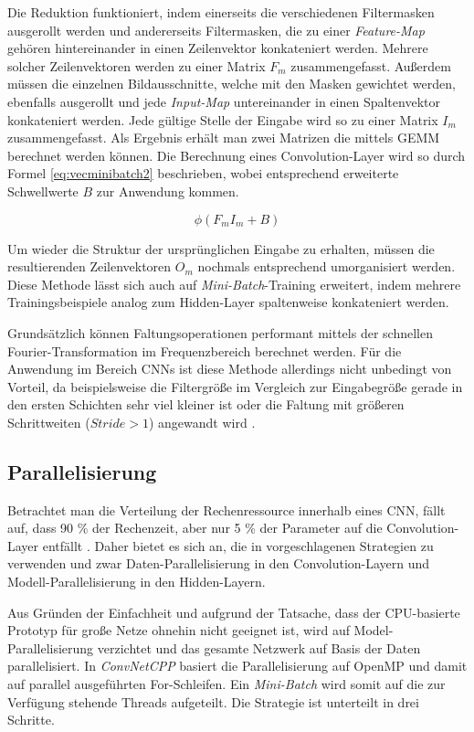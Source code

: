 Die Reduktion funktioniert, indem einerseits die verschiedenen Filtermasken ausgerollt werden und andererseits Filtermasken, die zu einer \textit{Feature-Map} gehören hintereinander in einen Zeilenvektor konkateniert werden. Mehrere solcher Zeilenvektoren werden zu einer Matrix $F_m$ zusammengefasst. Außerdem müssen die einzelnen Bildausschnitte, welche mit den Masken gewichtet werden, ebenfalls ausgerollt und jede \textit{Input-Map} untereinander in einen Spaltenvektor konkateniert werden. Jede gültige Stelle der Eingabe wird so zu einer Matrix $I_m$ zusammengefasst. Als Ergebnis erhält man zwei Matrizen die mittels GEMM berechnet werden können. Die Berechnung eines Convolution-Layer wird so durch Formel \ref{eq:vecminibatch2} beschrieben, wobei entsprechend erweiterte Schwellwerte $B$ zur Anwendung kommen.

\begin{equation}
\label{eq:vecminibatch2} 
\phi(F_m I_m + B)
\end{equation}

Um wieder die Struktur der ursprünglichen Eingabe zu erhalten, müssen die resultierenden Zeilenvektoren $O_m$ nochmals entsprechend umorganisiert werden.
Diese Methode lässt sich auch auf \textit{Mini-Batch}-Training erweitert, indem mehrere Trainingsbeispiele analog zum Hidden-Layer spaltenweise konkateniert werden.

Grundsätzlich können Faltungsoperationen performant mittels der schnellen Fourier-Transformation im Frequenzbereich berechnet werden. Für die Anwendung im Bereich CNNs ist diese Methode allerdings nicht unbedingt von Vorteil, da beispielsweise die Filtergröße im Vergleich zur Eingabegröße gerade in den ersten Schichten sehr viel kleiner ist oder die Faltung mit größeren Schrittweiten (\textit{$Stride > 1$}) angewandt wird \cite[vgl.][]{Chetlur14}.

\subsection{Parallelisierung}
Betrachtet man die Verteilung der Rechenressource innerhalb eines CNN, fällt auf, dass 90 \% der Rechenzeit, aber nur 5 \% der Parameter auf die Convolution-Layer entfällt \cite[vgl.][]{Krizhevsky2014}. Daher bietet es sich an, die in \cite{Krizhevsky2014} vorgeschlagenen Strategien zu verwenden und zwar Daten-Parallelisierung in den Convolution-Layern und Modell-Paralleli\-sier\-ung in den Hidden-Layern.

Aus Gründen der Einfachheit und aufgrund der Tatsache, dass der CPU-basierte Prototyp für große Netze ohnehin nicht geeignet ist, wird auf Model-Parallelisierung verzichtet und das gesamte Netzwerk auf Basis der Daten parallelisiert. 
In \textit{ConvNetCPP} basiert die Parallelisierung auf OpenMP und damit auf parallel ausgeführten For-Schleifen. Ein \textit{Mini-Batch} wird somit auf die zur Verfügung stehende Threads aufgeteilt. Die Strategie ist unterteilt in drei Schritte.

